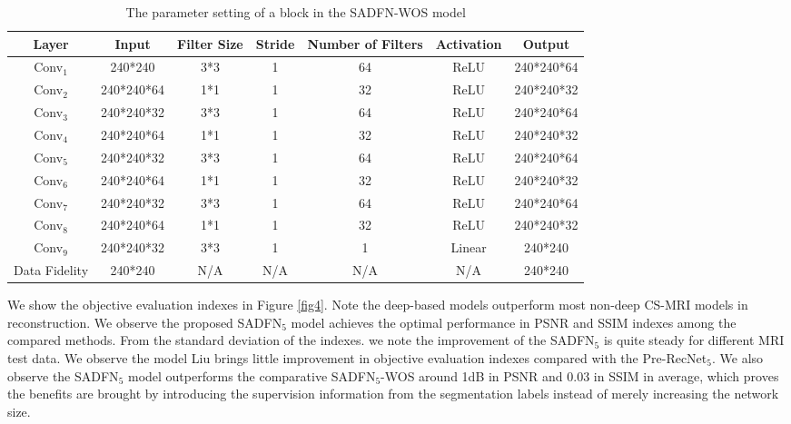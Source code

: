 \documentclass[runningheads]{llncs}
\begin{document}
\begin{table}[]
\centering
\caption{The parameter setting of a block in the SADFN-WOS model}
\label{SADFN-WOS}
\begin{tabular}{|c|c|c|c|c|c|c|}
\hline
Layer         & Input      & Filter Size & Stride & Number of Filters & Activation & Output     \\ \hline
Conv$_1$         & 240*240    & 3*3         & 1      & 64                & ReLU       & 240*240*64 \\ \hline
Conv$_2$         & 240*240*64 & 1*1         & 1      & 32                & ReLU       & 240*240*32 \\ \hline
Conv$_3$         & 240*240*32 & 3*3         & 1      & 64                & ReLU       & 240*240*64 \\ \hline
Conv$_4$         & 240*240*64 & 1*1         & 1      & 32                & ReLU       & 240*240*32 \\ \hline
Conv$_5$         & 240*240*32 & 3*3         & 1      & 64                & ReLU       & 240*240*64 \\ \hline
Conv$_6$         & 240*240*64 & 1*1         & 1      & 32                & ReLU       & 240*240*32 \\ \hline
Conv$_7$         & 240*240*32 & 3*3         & 1      & 64                & ReLU       & 240*240*64 \\ \hline
Conv$_8$         & 240*240*64 & 1*1         & 1      & 32                & ReLU       & 240*240*32 \\ \hline
Conv$_{9}$        & 240*240*32 & 3*3         & 1      & 1                 & Linear     & 240*240    \\ \hline
Data Fidelity & 240*240    & N/A         & N/A    & N/A               & N/A        & 240*240    \\ \hline
\end{tabular}
\end{table}

We show the objective evaluation indexes in Figure \ref{fig4}. Note the deep-based models outperform most non-deep CS-MRI models in reconstruction. We observe the proposed SADFN$_5$ model achieves the optimal performance in PSNR and SSIM indexes among the compared methods. From the standard deviation of the indexes. we note the improvement of the SADFN$_5$ is quite steady for different MRI test data. We observe the model Liu \cite{27} brings little improvement in objective evaluation indexes compared with the Pre-RecNet$_5$. We also observe the SADFN$_5$ model outperforms the comparative SADFN$_5$-WOS around 1dB in PSNR and 0.03 in SSIM in average, which proves the benefits are brought by introducing the supervision information from the segmentation labels instead of merely increasing the network size.
\end{document}
